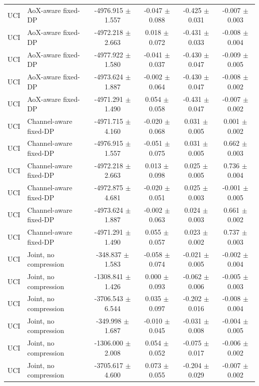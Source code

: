 \begin{table}[t]
\begin{tabular}{llcccc}
UCI & AoX-aware fixed-DP & -4976.915 $\pm$ 1.557 & -0.047 $\pm$ 0.088 & -0.425 $\pm$ 0.031 & -0.007 $\pm$ 0.003 \\
UCI & AoX-aware fixed-DP & -4972.218 $\pm$ 2.663 & 0.018 $\pm$ 0.072 & -0.431 $\pm$ 0.033 & -0.008 $\pm$ 0.004 \\
UCI & AoX-aware fixed-DP & -4977.922 $\pm$ 1.580 & -0.041 $\pm$ 0.037 & -0.430 $\pm$ 0.047 & -0.009 $\pm$ 0.005 \\
UCI & AoX-aware fixed-DP & -4973.624 $\pm$ 1.887 & -0.002 $\pm$ 0.064 & -0.430 $\pm$ 0.047 & -0.008 $\pm$ 0.002 \\
UCI & AoX-aware fixed-DP & -4971.291 $\pm$ 1.490 & 0.054 $\pm$ 0.058 & -0.431 $\pm$ 0.047 & -0.007 $\pm$ 0.002 \\
UCI & Channel-aware fixed-DP & -4971.715 $\pm$ 4.160 & -0.020 $\pm$ 0.068 & 0.031 $\pm$ 0.005 & 0.001 $\pm$ 0.002 \\
UCI & Channel-aware fixed-DP & -4976.915 $\pm$ 1.557 & -0.051 $\pm$ 0.075 & 0.031 $\pm$ 0.005 & 0.662 $\pm$ 0.003 \\
UCI & Channel-aware fixed-DP & -4972.218 $\pm$ 2.663 & 0.013 $\pm$ 0.098 & 0.025 $\pm$ 0.005 & 0.736 $\pm$ 0.004 \\
UCI & Channel-aware fixed-DP & -4972.875 $\pm$ 4.681 & -0.020 $\pm$ 0.051 & 0.025 $\pm$ 0.003 & -0.001 $\pm$ 0.005 \\
UCI & Channel-aware fixed-DP & -4973.624 $\pm$ 1.887 & -0.002 $\pm$ 0.063 & 0.024 $\pm$ 0.003 & 0.661 $\pm$ 0.002 \\
UCI & Channel-aware fixed-DP & -4971.291 $\pm$ 1.490 & 0.055 $\pm$ 0.057 & 0.023 $\pm$ 0.002 & 0.737 $\pm$ 0.003 \\
UCI & Joint, no compression & -348.837 $\pm$ 1.583 & -0.058 $\pm$ 0.074 & -0.021 $\pm$ 0.005 & -0.002 $\pm$ 0.004 \\
UCI & Joint, no compression & -1308.841 $\pm$ 1.426 & 0.000 $\pm$ 0.093 & -0.062 $\pm$ 0.006 & -0.005 $\pm$ 0.003 \\
UCI & Joint, no compression & -3706.543 $\pm$ 6.544 & 0.035 $\pm$ 0.097 & -0.202 $\pm$ 0.016 & -0.008 $\pm$ 0.004 \\
UCI & Joint, no compression & -349.998 $\pm$ 1.687 & -0.010 $\pm$ 0.045 & -0.031 $\pm$ 0.008 & -0.004 $\pm$ 0.005 \\
UCI & Joint, no compression & -1306.000 $\pm$ 2.008 & 0.054 $\pm$ 0.052 & -0.075 $\pm$ 0.017 & -0.006 $\pm$ 0.002 \\
UCI & Joint, no compression & -3705.617 $\pm$ 4.600 & 0.073 $\pm$ 0.055 & -0.204 $\pm$ 0.029 & -0.007 $\pm$ 0.002 \\

\end{tabular}
\end{table}
